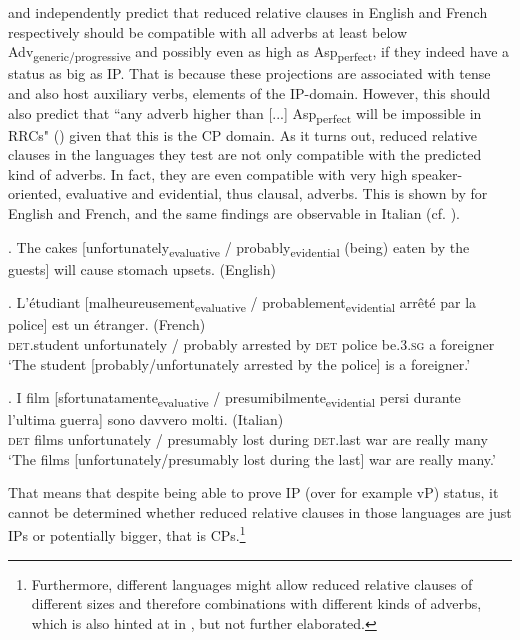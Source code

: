 \documentclass [output=book,colorlinks,citecolor=brown]{langscibook}
\begin{document}
\citet{douglas:2016:syntactic} and \citet{harwood:2018:rrc} independently predict that reduced relative clauses in English and French respectively should be compatible with all adverbs at least below Adv\textsubscript{generic/progressive} and possibly even as high as Asp\textsubscript{perfect}, if they indeed have a status as big as IP. That is because these projections are associated with tense and also host auxiliary verbs, elements of the IP-domain. However, this should also predict that ``any adverb higher than [...] Asp\textsubscript{perfect} will be impossible in RRCs" (\citealt[223]{douglas:2016:syntactic}) given that this is the CP domain. As it turns out, reduced relative clauses in the languages they test are not only compatible with the predicted kind of adverbs. In fact, they are even compatible with very high speaker-oriented, evaluative and evidential, thus clausal, adverbs. This is shown by \citet[226–230; 239–245]{douglas:2016:syntactic} for English and French, and the same findings are observable in Italian (cf. \citealt[214]{cinque:2020:relcl}). %

\ex. The cakes [unfortunately\textsubscript{evaluative} / probably\textsubscript{evidential} (being) eaten by the guests] will cause stomach upsets. (English) \null \hfill \citep[226]{douglas:2016:syntactic}

\exg. L’étudiant [malheureusement\textsubscript{evaluative} / probablement\textsubscript{evidential} arrêté par la police] est un étranger. (French)\\
\textsc{det}.student unfortunately / probably arrested by \textsc{det} police be.\textsc{3.sg} a foreigner\\
`The student [probably/unfortunately arrested by the police] is a foreigner.’ \null \hfill \citep[241]{douglas:2016:syntactic}

\exg. I film [sfortunatamente\textsubscript{evaluative} / presumibilmente\textsubscript{evidential} persi durante l’ultima guerra] sono davvero molti. (Italian)\\
\textsc{det} films unfortunately / presumably lost during \textsc{det}.last war are really many\\
`The films [unfortunately/presumably lost during the last] war are really many.’ \null \hfill \citep[214]{cinque:2020:relcl}

That means that despite being able to prove IP (over for example vP) status, it cannot be determined whether reduced relative clauses in those languages are just IPs or potentially bigger, that is CPs.\footnote{Furthermore, different languages might allow reduced relative clauses of different sizes and therefore combinations with different kinds of adverbs, which is also hinted at in \citet[76–77]{krause:2001:rrc}, but not further elaborated.} %
\end{document}
